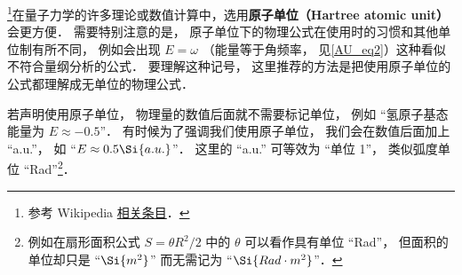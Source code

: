 

\footnote{参考 Wikipedia \href{https://en.wikipedia.org/wiki/Hartree_atomic_units}{相关条目}．}在量子力学的许多理论或数值计算中，选用\textbf{原子单位（Hartree atomic unit）}会更方便． 需要特别注意的是， 原子单位下的物理公式在使用时的习惯和其他单位制有所不同， 例如会出现 $E = \omega$ （能量等于角频率， 见\autoref{AU_eq2}）这种看似不符合量纲分析的公式． 要理解这种记号， 这里推荐的方法是把使用原子单位的公式都理解成无单位的物理公式．

若声明使用原子单位， 物理量的数值后面就不需要标记单位， 例如 “氢原子基态能量为 $E \approx -0.5$”． 有时候为了强调我们使用原子单位， 我们会在数值后面加上 “a.u.”， 如 “$E \approx 0.5 \Si{a.u.}$”． 这里的 “a.u.” 可等效为 “单位 1”， 类似弧度单位 “Rad”\footnote{例如在扇形面积公式 $S = \theta R^2/2$ 中的 $\theta$ 可以看作具有单位 “Rad”， 但面积的单位却只是 “$\Si{m^2}$” 而无需记为 “$\Si{Rad\cdot m^2}$”．}．


